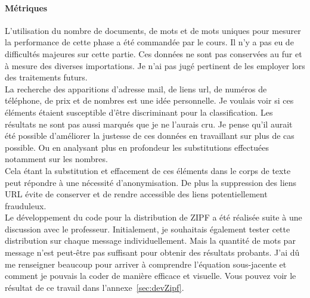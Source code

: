     \paragraph{Métriques}
        L'utilisation du nombre de documents, de mots et de mots uniques pour mesurer la performance de cette phase a été commandée par le cours.
        Il n'y a pas eu de difficultés majeures sur cette partie.
        Ces données ne sont pas conservées au fur et à mesure des diverses importations.
        Je n'ai pas jugé pertinent de les employer lors des traitements futurs. \\

        La recherche des apparitions d'adresse mail, de liens url, de numéros de téléphone, de prix et de nombres est une idée personnelle.
        Je voulais voir si ces éléments étaient susceptible d'être discriminant pour la classification.
        Les résultats ne sont pas aussi marqués que je ne l'aurais cru.
        Je pense qu'il aurait été possible d'améliorer la justesse de ces données en travaillant sur plus de cas possible.
        Ou en analysant plus en profondeur les substitutions effectuées notamment sur les nombres.\\
        Cela étant la substitution et effacement de ces éléments dans le corps de texte peut répondre à une nécessité d'anonymisation.
        De plus la suppression des liens URL évite de conserver et de rendre accessible des liens potentiellement frauduleux.\\

        Le développement du code pour la distribution de ZIPF a été réalisée suite à une discussion avec le professeur.
        Initialement, je souhaitais également tester cette distribution sur chaque message individuellement.
        Mais la quantité de mots par message n'est peut-être pas suffisant pour obtenir des résultats probants.
        J'ai dû me renseigner beaucoup pour arriver à comprendre l'équation sous-jacente et comment je pouvais la coder de manière efficace et visuelle.
        Vous pouvez voir le résultat de ce travail dans l'annexe~\ref{sec:devZipf}.

